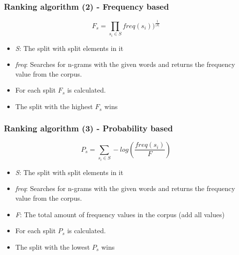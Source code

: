 \documentclass[accentcolor=tud9b, colorbacktitle, inverttitle]{tudbeamer}
\begin{document}
\begin{frame}
  \frametitle{Ranking algorithm (2) - Frequency based \cite[Alfonseca et al.]{alf2008}}

  \begin{equation}
    F_s = \prod_{s_i \in S} freq(s_i))^{\frac{1}{|S|}}
  \end{equation}

  \begin{itemize}
    \item \emph{S}: The split with split elements in it
    \item \emph{freq}: Searches for n-grams with the given words and returns the frequency value from the corpus.

    \vspace{10pt}
    \item For each split $F_s$ is calculated.
    \item The split with the highest $F_s$ wins
  \end{itemize}
\end{frame}

\begin{frame}
  \frametitle{Ranking algorithm (3) - Probability based \cite[Alfonseca et al.]{alf2008}}

  \begin{equation}
    P_s = \sum_{s_i \in S} -log(\frac{freq(s_i)}{F})
  \end{equation}

  \begin{itemize}
    \item \emph{S}: The split with split elements in it
    \item \emph{freq}: Searches for n-grams with the given words and returns the frequency value from the corpus.
    \item \emph{F}: The total amount of frequency values in the corpus (add all values)

    \vspace{10pt}
    \item For each split $P_s$ is calculated.
    \item The split with the lowest $P_s$ wins
  \end{itemize}
\end{frame}
\end{document}
